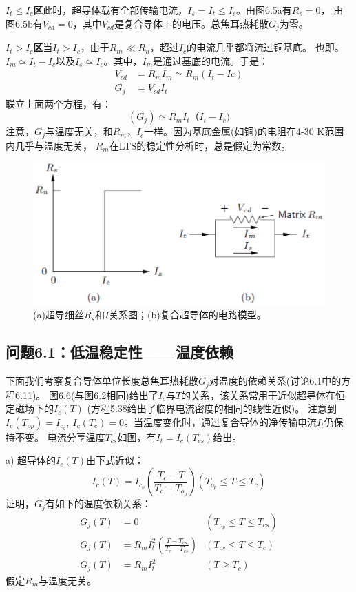 \textbf{$I_t\le I_c$区}\quad 此时，超导体载有全部传输电流，$I_s=I_t\le I_c$。由图6.5a有$R_s=0$，
由图6.5b有$V_{cd}=0$，其中$V_{cd}$是复合导体上的电压。总焦耳热耗散$G_j$为零。

\textbf{$I_t>I_c$区}\quad 当$I_t>I_c$，由于$R_m\ll R_n$，超过$I_c$的电流几乎都将流过铜基底。
也即。$I_m\simeq I_t-I_c$以及$I_s\simeq I_c$。其中，$I_m$是通过基底的电流。于是：
\begin{subequations}
	\begin{align}
	V_{cd}&=R_mI_m\simeq R_m{(I_t-Ic)}\\
	G_{j}&=V_{cd}I_t
	\end{align}
\end{subequations}
联立上面两个方程，有：
\begin{equation}%
{(G_j)}\simeq R_{m}I_{t}{（I_t-I_c)}
\end{equation}
注意，$G_j$与温度无关，和$R_m，I_c$一样。因为基底金属(如铜)的电阻在4-30 K范围内几乎与温度无关，
$R_m$在LTS的稳定性分析时，总是假定为常数。
\begin{figure}[htbp]
	\centering
	\includegraphics[scale=0.6]{chpt6/figs/fig6.5.eps}
	\caption{(a)超导细丝$R_s$和$I$关系图；(b)复合超导体的电路模型。}
\end{figure}

\subsection{问题6.1：低温稳定性——温度依赖}
下面我们考察复合导体单位长度总焦耳热耗散$G_j$对温度的依赖关系(讨论6.1中的方程6.11)。
图6.6(与图6.2相同)给出了$I_c$与$T$的关系，该关系常用于近似超导体在恒定磁场下的$I_c(T)$
(方程5.38给出了临界电流密度的相同的线性近似)。
注意到$I_c(T_{op})=I_{c_o},\ I_c(T_c)=0$。当温度变化时，通过复合导体的净传输电流$I_t$仍保持不变。
电流分享温度$T_{cs}$如图，有$I_t=I_c(T_{cs})$给出。

a) 超导体的$I_c(T)$由下式近似：
\begin{equation}%
I_c(T)=I_{c_o}(\frac{T_c-T}{T_c-T_{o_p}}) (T_{o_p}\leq T \leq T_c)
\end{equation}
证明，$G_j$有如下的温度依赖关系：
\begin{subequations}
	\begin{align}
	G_j(T)&=0 &(T_{o_p}\leq T \leq T_{cs})\\
	G_j(T)&=R_mI_t^2(\frac{T-T_{cs}}{T_c-T_{cs}})&(T_{cs}\leq T\leq T_c)\\
	G_j(T)&=R_mI_t^2 &(T\ge T_c)
	\end{align}
\end{subequations}
假定$R_m$与温度无关。

